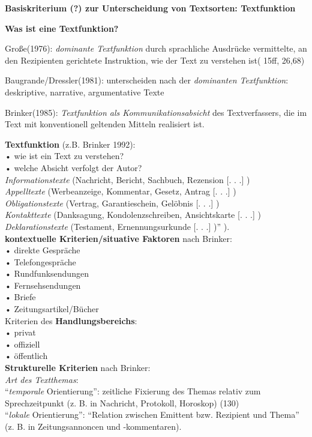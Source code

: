 \documentclass[
  letterpaper,
]{scrbook}
\begin{document}
\textbf{Basiskriterium (?) zur Unterscheidung von Textsorten:
Textfunktion}

\textbf{Was ist eine Textfunktion?}

Große(1976): \emph{dominante Textfunktion} durch sprachliche Ausdrücke
vermittelte, an den Rezipienten gerichtete Instruktion, wie der Text zu
verstehen ist( 15ff, 26,68)

Baugrande/Dressler(1981): unterscheiden nach der \emph{dominanten
Textfunktion}: deskriptive, narrative, argumentative Texte

Brinker(1985): \emph{Textfunktion als Kommunikationsabsicht} des
Textverfassers, die im Text mit konventionell geltenden Mitteln
realisiert ist.

\textbf{Textfunktion} (z.B. Brinker 1992):\\
• wie ist ein Text zu verstehen?\\
• welche Absicht verfolgt der Autor?\\
\emph{Informationstexte} (Nachricht, Bericht, Sachbuch, Rezension {[}. .
.{]} )\\
\emph{Appelltexte} (Werbeanzeige, Kommentar, Gesetz, Antrag {[}. . .{]}
)\\
\emph{Obligationstexte} (Vertrag, Garantieschein, Gelöbnis {[}. . .{]}
)\\
\emph{Kontakttexte} (Danksagung, Kondolenzschreiben, Ansichtskarte {[}.
. .{]} )\\
\emph{Deklarationstexte} (Testament, Ernennungsurkunde {[}. . .{]} )''
).\\

\textbf{kontextuelle Kriterien/situative Faktoren} nach Brinker:\\
• direkte Gespräche\\
• Telefongespräche\\
• Rundfunksendungen\\
• Fernsehsendungen\\
• Briefe\\
• Zeitungsartikel/Bücher\\

Kriterien des \textbf{Handlungsbereichs}:\\
• privat\\
• offiziell\\
• öffentlich\\

\textbf{Strukturelle Kriterien} nach Brinker:\\
\emph{Art des Textthemas}:\\
``\emph{temporale} Orientierung'': zeitliche Fixierung des Themas
relativ zum Sprechzeitpunkt (z. B. in Nachricht, Protokoll, Horoskop)
(130)\\
``\emph{lokale} Orientierung'': ``Relation zwischen Emittent bzw.
Rezipient und Thema'' (z. B. in Zeitungsannoncen und -kommentaren).\\
\end{document}
